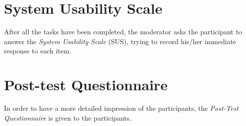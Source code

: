 \documentclass[a4paper]{article}
\begin{document}
\section{System Usability Scale}

After all the tasks have been completed, the moderator asks the participant to answer the \textit{System Usability Scale} (SUS), trying to record his/her immediate response to each item.


\section{Post-test Questionnaire}

In order to have a more detailed impression of the participants, the \textit{Post-Test Questionnaire} is given to the participants.
\end{document}
